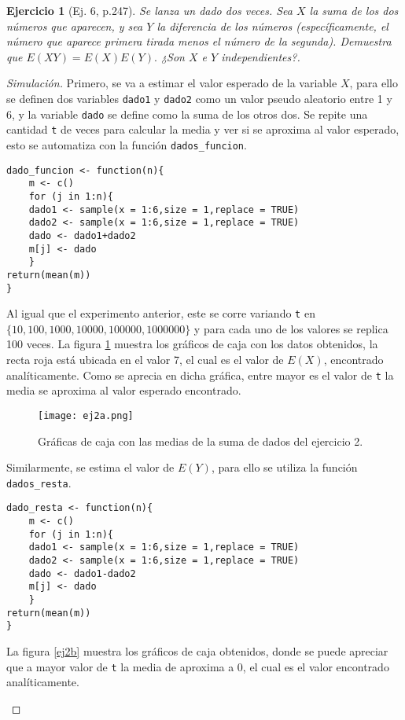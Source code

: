 \documentclass[12pt,letterpaper]{article}
\newtheorem{ej}{Ejercicio}
\begin{document}
\begin{ej}[Ej. 6, p.247]
Se lanza un dado dos veces. Sea $X$ la suma de los dos números que aparecen, y sea $Y$ la diferencia de los números (específicamente, el número que aparece primera tirada menos el número de la segunda). Demuestra que $E(XY)=E(X)E(Y).$ ¿Son $X$ e $Y$ independientes?.
\end{ej}
\begin{proof}[Simulación] 
Primero, se va a estimar el valor esperado de la variable $X$, para ello se definen dos variables \texttt{dado1} y \texttt{dado2} como un valor pseudo aleatorio entre 1 y 6, y la variable \texttt{dado} se define como la suma de los otros dos. Se repite una cantidad \texttt{t} de veces para calcular la media y ver si se aproxima al valor esperado, esto se automatiza con la función \texttt{dados\_funcion}.
\begin{lstlisting}
dado_funcion <- function(n){
    m <- c()
    for (j in 1:n){
    dado1 <- sample(x = 1:6,size = 1,replace = TRUE)
    dado2 <- sample(x = 1:6,size = 1,replace = TRUE)
    dado <- dado1+dado2
    m[j] <- dado
    }
return(mean(m))
}
\end{lstlisting}
Al igual que el experimento anterior, este se corre variando \texttt{t} en $\{10, 100, 1000, 10000, 100000, 1000000\}$ y para cada uno de los valores se replica 100 veces. La figura \ref{ej2a} muestra los gráficos de caja con los datos obtenidos, la recta roja está ubicada en el valor 7, el cual es el valor de $E(X)$, encontrado analíticamente. Como se aprecia en dicha gráfica, entre mayor es el valor de \texttt{t} la media se aproxima al valor esperado encontrado.
\begin{figure}
 	\centering 
 		\texttt{[image: ej2a.png]} 		
 	 	\caption{Gráficas de caja con las medias de la suma de dados del ejercicio 2.} 
 	 		\label{ej2a}
\end{figure}
Similarmente, se estima el valor de $E(Y)$, para ello se utiliza la función \texttt{dados\_resta}.
\begin{lstlisting}
dado_resta <- function(n){
    m <- c()
    for (j in 1:n){
    dado1 <- sample(x = 1:6,size = 1,replace = TRUE)
    dado2 <- sample(x = 1:6,size = 1,replace = TRUE)
    dado <- dado1-dado2
    m[j] <- dado
    }
return(mean(m))
}
\end{lstlisting}
La figura \ref{ej2b} muestra los gráficos de caja obtenidos, donde se puede apreciar que a mayor valor de \texttt{t} la media de aproxima a 0, el cual es el valor encontrado analíticamente.
\begin{figure}

\end{figure}
\end{proof}
\end{document}
